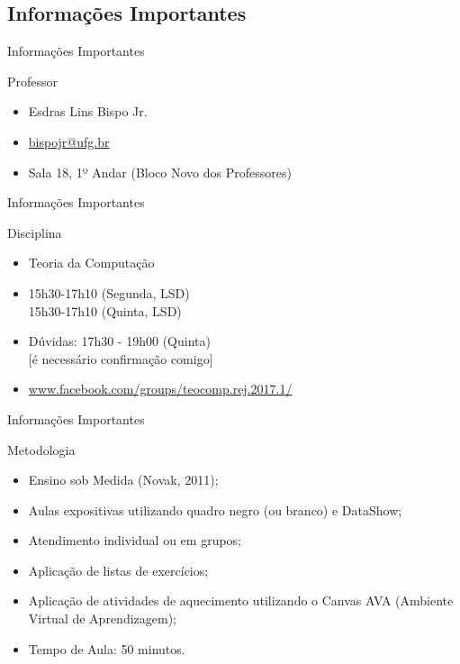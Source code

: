 \documentclass[xcolor=dvipsnames,table]{beamer}
\begin{document}
	\subsection{Informações Importantes}
	\begin{frame}{Informações Importantes}
		\begin{block}{Professor}
			\begin{itemize}
				\item Esdras Lins Bispo Jr.
				\item \url{bispojr@ufg.br}
				\item Sala 18, 1º Andar (Bloco Novo dos Professores)
			\end{itemize}
		\end{block}
	\end{frame}	
	
	\begin{frame}{Informações Importantes}
		\begin{block}{Disciplina}
			\begin{itemize}
				\item Teoria da Computação
				\item 15h30-17h10 (Segunda, LSD)\\
					  15h30-17h10 (Quinta, LSD)
				\item Dúvidas: 17h30 - 19h00 (Quinta)\\
					  {\color{red}[é necessário confirmação comigo]}
				\item \url{www.facebook.com/groups/teocomp.rej.2017.1/}
			\end{itemize}
		\end{block}
	\end{frame}
	
	\begin{frame}{Informações Importantes}
		\begin{block}{Metodologia}
			\begin{itemize}
				\item Ensino sob Medida (Novak, 2011);
				\item Aulas expositivas utilizando quadro negro (ou branco) e DataShow;
				\item Atendimento individual ou em grupos;
				\item Aplicação de listas de exercícios;
				\item Aplicação de atividades de aquecimento utilizando o 
				Canvas AVA (Ambiente Virtual de Aprendizagem);
				\item Tempo de Aula: 50 minutos.
			\end{itemize}
		\end{block}
	\end{frame}
	
\end{document}
